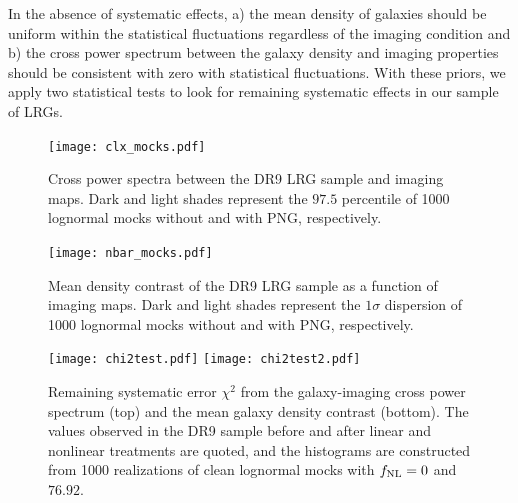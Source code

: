 In the absence of systematic effects, a) the mean density of galaxies should be uniform within the statistical fluctuations regardless of the imaging condition and b) the cross power spectrum between the galaxy density and imaging properties should be consistent with zero with statistical fluctuations. With these priors, we apply two statistical tests to look for remaining systematic effects in our sample of LRGs.

\begin{figure}
\centering
\texttt{[image: clx\_mocks.pdf]}
\caption{Cross power spectra between the DR9 LRG sample and imaging maps. Dark and light shades represent the $97.5$ percentile of 1000 lognormal mocks without and with PNG, respectively.}\label{fig:clxmock}
\end{figure}

\begin{figure}
\centering
\texttt{[image: nbar\_mocks.pdf]}
\caption{Mean density contrast of the DR9 LRG sample as a function of imaging maps. Dark and light shades represent the $1\sigma$ dispersion of 1000 lognormal mocks without and with PNG, respectively.}\label{fig:nbarmock}
\end{figure}


\begin{figure}
\raggedleft
\texttt{[image: chi2test.pdf]}
\texttt{[image: chi2test2.pdf]}
\caption{Remaining systematic error $\chi^{2}$ from the galaxy-imaging cross power spectrum (top) and the mean galaxy density contrast (bottom). The values observed in the DR9 sample before and after linear and nonlinear treatments are quoted, and the histograms are constructed from 1000 realizations of clean lognormal mocks with $f_{\rm NL}=0$ and $76.92$.}\label{fig:chi2test}
\end{figure}


